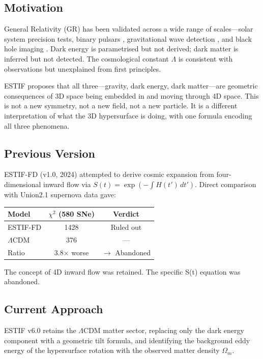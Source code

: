 \documentclass[12pt]{article}
\begin{document}
\subsection{Motivation}

General Relativity (GR) has been validated across a wide range of scales---solar system
precision tests, binary pulsars \cite{Will2014}, gravitational wave detection
\cite{Abbott2016}, and black hole imaging \cite{EHT2019}. Dark energy is parametrised
but not derived; dark matter is inferred but not detected. The cosmological constant
$\Lambda$ is consistent with observations but unexplained from first principles.

ESTIF proposes that all three---gravity, dark energy, dark matter---are geometric
consequences of 3D space being embedded in and moving through 4D space. This is
not a new symmetry, not a new field, not a new particle. It is a different interpretation
of what the 3D hypersurface is doing, with one formula encoding all three phenomena.

\subsection{Previous Version}

ESTIF-FD (v1.0, 2024) attempted to derive cosmic expansion from four-dimensional
inward flow via $S(t) = \exp(-\int H(t')\,dt')$. Direct comparison with Union2.1
supernova data gave:

\begin{center}
\begin{tabular}{lcc}
\toprule
Model & $\chi^2$ (580 SNe) & Verdict \\
\midrule
ESTIF-FD & 1428 & Ruled out \\
$\Lambda$CDM & 376 & --- \\
Ratio & 3.8$\times$ worse & $\longrightarrow$ Abandoned \\
\bottomrule
\end{tabular}
\end{center}

The concept of 4D inward flow was retained. The specific S(t) equation was abandoned.

\subsection{Current Approach}

ESTIF v6.0 retains the $\Lambda$CDM matter sector, replacing only the dark energy
component with a geometric tilt formula, and identifying the background eddy energy
of the hypersurface rotation with the observed matter density $\Omega_m$.
\end{document}

